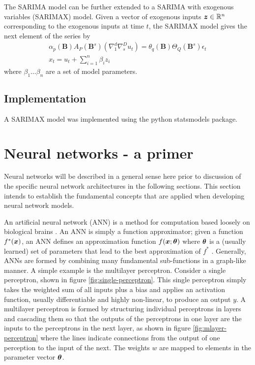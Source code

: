 The SARIMA model can be further extended to a SARIMA with exogenous variables (SARIMAX) model.
Given a vector of exogenous inputs ${\bm{z}} \in \mathbb{R}^{n}$ corresponding to the exogenous inputs at time $t$, the SARIMAX model gives the next element of the series by
\begin{gather}	
\alpha_{p}(\textbf{B})A_{P}(\textbf{B}^{s})(\nabla_{1}^{d}\nabla_{s}^{D}u_{t}) = \theta_{q}(\textbf{B})\Theta_{Q}(\textbf{B}^{s})\epsilon_{t} \\	
x_{t} = u_{t} + \sum_{i=1}^{n}\beta_{i}z_{i}
\end{gather}
where $\beta_{1} \ldots \beta_{n}$ are a set of model parameters.

\subsection{Implementation}
A SARIMAX model was implemented using the python statsmodels package.


\section{Neural networks - a primer}
Neural networks will be described in a general sense here prior to discussion of the specific neural network architectures in the following sections.
This section intends to establish the fundamental concepts that are applied when developing neural network models.

An artificial neural network (ANN) is a method for computation based loosely on biological brains \citep{negnevitsky2005artificial}.
An ANN is simply a function approximator; given a function $f^*({\bm{x}})$, an ANN defines an approximation function $f({\bm{x}}; {\bm{\theta}})$ where ${\bm{\theta}}$ is a (usually learned) set of parameters that lead to the best approximation of $f^*$ \citep{Goodfellow-et-al-2016}. 
Generally, ANNs are formed by combining many fundamental sub-functions in a graph-like manner. 
A simple example is the multilayer perceptron.
Consider a single perceptron, shown in figure \ref{fig:single-perceptron}.
This single perceptron simply takes the weighted sum of all inputs plus a bias and applies an activation function, usually differentiable and highly non-linear, to produce an output $y$.
A multilayer perceptron is formed by structuring individual perceptrons in layers and cascading them so that the outputs of the perceptrons in one layer are the inputs to the perceptrons in the next layer, as shown in figure \ref{fig:mlayer-perceptron} where the lines indicate connections from the output of one perception to the input of the next.
The weights $w$ are mapped to elements in the parameter vector ${\bm{\theta}}$.

